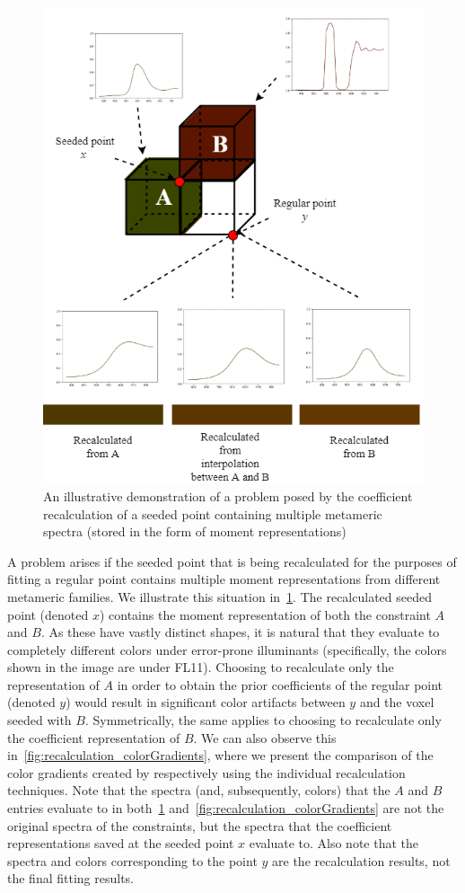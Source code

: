 \begin{figure}[t!]
	\centering
	\captionsetup[subfigure]{font=footnotesize,labelfont=footnotesize}
	\includegraphics[width=0.8\linewidth]{img/recalculation.png}
	\caption{An illustrative demonstration of a problem posed by the coefficient recalculation of a seeded point containing multiple metameric spectra (stored in the form of moment representations)}
	\label{fig:recalculation_process}
\end{figure}

A problem arises if the seeded point that is being recalculated for the purposes of fitting a regular point contains multiple moment representations from different metameric families. We illustrate this situation in~\cref{fig:recalculation_process}. The recalculated seeded point (denoted $x$) contains the moment representation of both the constraint $A$ and $B$. As these have vastly distinct shapes, it is natural that they evaluate to completely different colors under error-prone illuminants (specifically, the colors shown in the image are under FL11). Choosing to recalculate only the representation of $A$ in order to obtain the prior coefficients of the regular point (denoted $y$) would result in significant color artifacts between $y$ and the voxel seeded with $B$. Symmetrically, the same applies to choosing to recalculate only the coefficient representation of $B$. We can also observe this in~\cref{fig:recalculation_colorGradients}, where we present the comparison of the color gradients created by respectively using the individual recalculation techniques. Note that the spectra (and, subsequently, colors) that the $A$ and $B$ entries evaluate to in both~\cref{fig:recalculation_process} and~\cref{fig:recalculation_colorGradients} are not the original spectra of the constraints, but the spectra that the coefficient representations saved at the seeded point $x$ evaluate to. Also note that the spectra and colors corresponding to the point $y$ are the recalculation results, not the final fitting results.

